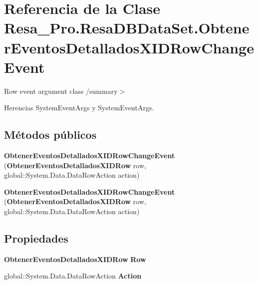 \section{Referencia de la Clase Resa\+\_\+\+Pro.\+Resa\+D\+B\+Data\+Set.\+Obtener\+Eventos\+Detallados\+X\+I\+D\+Row\+Change\+Event}
\label{class_resa___pro_1_1_resa_d_b_data_set_1_1_obtener_eventos_detallados_x_i_d_row_change_event}


Row event argument class /summary$>$  




Herencias System\+Event\+Args y System\+Event\+Args.

\subsection*{Métodos públicos}
\begin{DoxyCompactItemize}
\item 
{\bfseries Obtener\+Eventos\+Detallados\+X\+I\+D\+Row\+Change\+Event} ({\bf Obtener\+Eventos\+Detallados\+X\+I\+D\+Row} row, global\+::\+System.\+Data.\+Data\+Row\+Action action)\label{class_resa___pro_1_1_resa_d_b_data_set_1_1_obtener_eventos_detallados_x_i_d_row_change_event_a752d7dfd4b9497819d80878f78f94913}

\item 
{\bfseries Obtener\+Eventos\+Detallados\+X\+I\+D\+Row\+Change\+Event} ({\bf Obtener\+Eventos\+Detallados\+X\+I\+D\+Row} row, global\+::\+System.\+Data.\+Data\+Row\+Action action)\label{class_resa___pro_1_1_resa_d_b_data_set_1_1_obtener_eventos_detallados_x_i_d_row_change_event_a752d7dfd4b9497819d80878f78f94913}

\end{DoxyCompactItemize}
\subsection*{Propiedades}
\begin{DoxyCompactItemize}
\item 
{\bf Obtener\+Eventos\+Detallados\+X\+I\+D\+Row} {\bfseries Row}\hspace{0.3cm}{\ttfamily  [get]}\label{class_resa___pro_1_1_resa_d_b_data_set_1_1_obtener_eventos_detallados_x_i_d_row_change_event_aaac9f9fd0e7e482fd71b8cbda094f4e4}

\item 
global\+::\+System.\+Data.\+Data\+Row\+Action {\bfseries Action}\hspace{0.3cm}{\ttfamily  [get]}\label{class_resa___pro_1_1_resa_d_b_data_set_1_1_obtener_eventos_detallados_x_i_d_row_change_event_ae932e8405d9b8fc48e888e2077bfc8de}

\end{DoxyCompactItemize}


